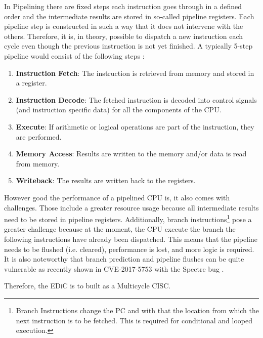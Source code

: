 In Pipelining there are fixed steps each instruction goes through in a defined order and the intermediate results are stored in so-called pipeline registers.
Each pipeline step is constructed in such a way that it does not intervene with the others.
Therefore, it is, in theory, possible to dispatch a new instruction each cycle even though the previous instruction is not yet finished.
A typically 5-step pipeline would consist of the following steps \cite{PattersonDavid2016RuRD}:
\begin{enumerate}
  \item \textbf{Instruction Fetch}: The instruction is retrieved from memory and stored in a register.
  \item \textbf{Instruction Decode}: The fetched instruction is decoded into control signals (and instruction specific data) for all the components of the \gls{CPU}.
  \item \textbf{Execute}: If arithmetic or logical operations are part of the instruction, they are performed.
  \item \textbf{Memory Access}: Results are written to the memory and/or data is read from memory.
  \item \textbf{Writeback}: The results are written back to the registers.
\end{enumerate}
However good the performance of a pipelined \gls{CPU} is, it also comes with challenges.
Those include a greater resource usage because all intermediate results need to be stored in pipeline registers.
Additionally, branch instructions\footnote{Branch Instructions change the \gls{PC} and with that the location from which the next instruction is to be fetched. This is required for conditional and looped execution.} pose a greater challenge because at the moment, the \gls{CPU} execute the branch the following instructions have already been dispatched.
This means that the pipeline needs to be flushed (i.e. cleared), performance is lost, and more logic is required.
It is also noteworthy that branch prediction and pipeline flushes can be quite vulnerable as recently shown in CVE-2017-5753 with the Spectre bug \cite{CVE-2017-5753}.

Therefore, the \gls{EDiC} is to built as a Multicycle \gls{CISC}.

